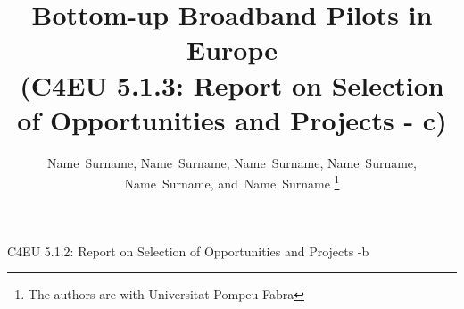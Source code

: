 \documentclass[draftclsnofoot,12pt,journal,onecolumn]{IEEEtran}
\begin{document}
%
\title{Bottom-up Broadband Pilots in Europe \\ (C4EU 5.1.3: Report on Selection of Opportunities and Projects - c)}
%
%
%

\author{
	Name~Surname, %
	Name~Surname, %
	Name~Surname, %
	Name~Surname, %
	Name~Surname, %
    and~Name~Surname%
\thanks{
The authors are with Universitat Pompeu Fabra
}
}


% 
%



%
{C4EU 5.1.2: Report on Selection of Opportunities and Projects -b}
% 
\end{document}
